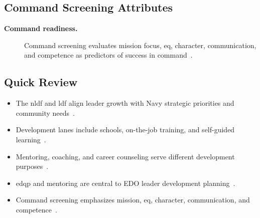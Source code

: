 \documentclass[../main.tex]{subfiles}
\begin{document}
\subsection{Command Screening Attributes}
\begin{description}
  \item[\textbf{Command readiness.}] Command screening evaluates mission focus, \ac{eq}, character,
  communication, and competence as predictors of success in command~\autocite{edo-5-2-10-leader-development-framework-2025}.
\end{description}

\subsection{Quick Review}
\begin{itemize}
  \item The \ac{nldf} and \ac{ldf} align leader growth with Navy strategic priorities and community needs~\autocite{edo-5-2-10-leader-development-framework-2025,Navy-NLDF-GRGB-Leaders-Toolkit-2026}.
  \item Development lanes include schools, on-the-job training, and self-guided learning~\autocite{edo-5-2-10-leader-development-framework-2025}.
  \item Mentoring, coaching, and career counseling serve different development purposes~\autocite{edo-5-2-10-leader-development-framework-2025}.
  \item \ac{edqp} and mentoring are central to EDO leader development planning~\autocite{edo-5-2-10-leader-development-framework-2025}.
  \item Command screening emphasizes mission, \ac{eq}, character, communication, and competence~\autocite{edo-5-2-10-leader-development-framework-2025}.
\end{itemize}

\end{document}
